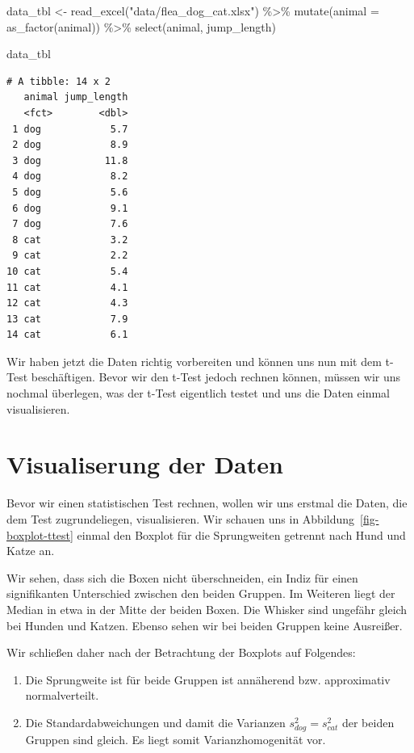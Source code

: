 \documentclass[
  letterpaper,
]{scrbook}
\newenvironment{Shaded}{\begin{snugshade}}{\end{snugshade}}
\newcommand{\AttributeTok}[1]{\textcolor[rgb]{0.40,0.45,0.13}{#1}}
\newcommand{\FunctionTok}[1]{\textcolor[rgb]{0.28,0.35,0.67}{#1}}
\newcommand{\NormalTok}[1]{\textcolor[rgb]{0.00,0.23,0.31}{#1}}
\newcommand{\OtherTok}[1]{\textcolor[rgb]{0.00,0.23,0.31}{#1}}
\newcommand{\SpecialCharTok}[1]{\textcolor[rgb]{0.37,0.37,0.37}{#1}}
\newcommand{\StringTok}[1]{\textcolor[rgb]{0.13,0.47,0.30}{#1}}
\providecommand{\tightlist}{%
  \setlength{\itemsep}{0pt}\setlength{\parskip}{0pt}}\usepackage{longtable,booktabs,array}
\begin{document}
\begin{Shaded}
\begin{Highlighting}[]
\NormalTok{data\_tbl }\OtherTok{\textless{}{-}} \FunctionTok{read\_excel}\NormalTok{(}\StringTok{"data/flea\_dog\_cat.xlsx"}\NormalTok{) }\SpecialCharTok{\%\textgreater{}\%} 
  \FunctionTok{mutate}\NormalTok{(}\AttributeTok{animal =} \FunctionTok{as\_factor}\NormalTok{(animal)) }\SpecialCharTok{\%\textgreater{}\%} 
  \FunctionTok{select}\NormalTok{(animal, jump\_length)}

\NormalTok{data\_tbl}
\end{Highlighting}
\end{Shaded}

\begin{verbatim}
# A tibble: 14 x 2
   animal jump_length
   <fct>        <dbl>
 1 dog            5.7
 2 dog            8.9
 3 dog           11.8
 4 dog            8.2
 5 dog            5.6
 6 dog            9.1
 7 dog            7.6
 8 cat            3.2
 9 cat            2.2
10 cat            5.4
11 cat            4.1
12 cat            4.3
13 cat            7.9
14 cat            6.1
\end{verbatim}

Wir haben jetzt die Daten richtig vorbereiten und können uns nun mit dem
t-Test beschäftigen. Bevor wir den t-Test jedoch rechnen können, müssen
wir uns nochmal überlegen, was der t-Test eigentlich testet und uns die
Daten einmal visualisieren.

\hypertarget{visualiserung-der-daten}{%
\section{Visualiserung der Daten}\label{visualiserung-der-daten}}

Bevor wir einen statistischen Test rechnen, wollen wir uns erstmal die
Daten, die dem Test zugrundeliegen, visualisieren. Wir schauen uns in
Abbildung~\ref{fig-boxplot-ttest} einmal den Boxplot für die
Sprungweiten getrennt nach Hund und Katze an.

Wir sehen, dass sich die Boxen nicht überschneiden, ein Indiz für einen
signifikanten Unterschied zwischen den beiden Gruppen. Im Weiteren liegt
der Median in etwa in der Mitte der beiden Boxen. Die Whisker sind
ungefähr gleich bei Hunden und Katzen. Ebenso sehen wir bei beiden
Gruppen keine Ausreißer.

Wir schließen daher nach der Betrachtung der Boxplots auf Folgendes:

\begin{enumerate}
\def\labelenumi{\arabic{enumi})}
\tightlist
\item
  Die Sprungweite ist für beide Gruppen ist annäherend bzw. approximativ
  normalverteilt.
\item
  Die Standardabweichungen und damit die Varianzen
  \(s^2_{dog} = s^2_{cat}\) der beiden Gruppen sind gleich. Es liegt
  somit Varianzhomogenität vor.
\end{enumerate}
\end{document}
